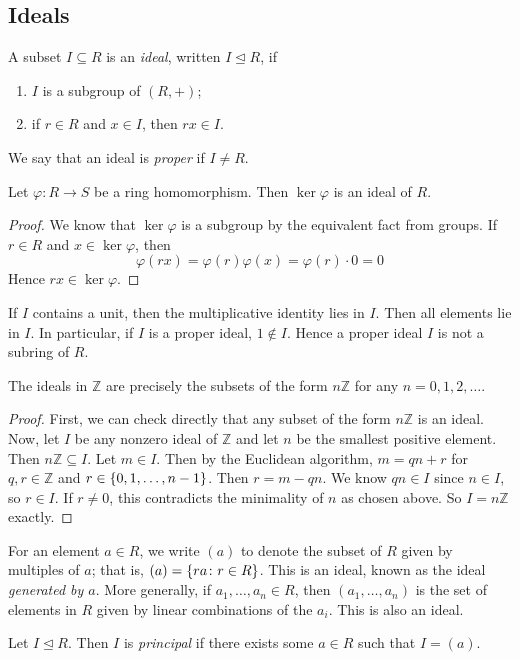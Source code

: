 \subsection{Ideals}
\begin{definition}
	A subset \( I \subseteq R \) is an \textit{ideal}, written \( I \trianglelefteq R \), if
	\begin{enumerate}
		\item \( I \) is a subgroup of \( (R, +) \);
		\item if \( r \in R \) and \( x \in I \), then \( rx \in I \).
	\end{enumerate}
	We say that an ideal is \textit{proper} if \( I \neq R \).
\end{definition}
\begin{lemma}
	Let \( \varphi \colon R \to S \) be a ring homomorphism.
	Then \( \ker \varphi \) is an ideal of \( R \).
\end{lemma}
\begin{proof}
	We know that \( \ker \varphi \) is a subgroup by the equivalent fact from groups.
	If \( r \in R \) and \( x \in \ker \varphi \), then
	\[ \varphi(rx) = \varphi(r) \varphi(x) = \varphi(r) \cdot 0 = 0 \]
	Hence \( rx \in \ker \varphi \).
\end{proof}
\begin{remark}
	If \( I \) contains a unit, then the multiplicative identity lies in \( I \).
	Then all elements lie in \( I \).
	In particular, if \( I \) is a proper ideal, \( 1 \not\in I \).
	Hence a proper ideal \( I \) is not a subring of \( R \).
\end{remark}
\begin{lemma}
	The ideals in \( \mathbb Z \) are precisely the subsets of the form \( n\mathbb Z \) for any \( n = 0, 1, 2, \dots \).
\end{lemma}
\begin{proof}
	First, we can check directly that any subset of the form \( n\mathbb Z \) is an ideal.
	Now, let \( I \) be any nonzero ideal of \( \mathbb Z \) and let \( n \) be the smallest positive element.
	Then \( n\mathbb Z \subseteq I \).
	Let \( m \in I \).
	Then by the Euclidean algorithm, \( m = qn+r \) for \( q,r \in \mathbb Z \) and \( r \in \qty{0, 1, \dots, n-1} \).
	Then \( r = m - qn \).
	We know \( qn \in I \) since \( n \in I \), so \( r \in I \).
	If \( r \neq 0 \), this contradicts the minimality of \( n \) as chosen above.
	So \( I = n\mathbb Z \) exactly.
\end{proof}
\begin{definition}
	For an element \( a \in R \), we write \( (a) \) to denote the subset of \( R \) given by multiples of \( a \); that is, \( (a) = \qty{ra \colon r\in R} \).
	This is an ideal, known as the ideal \textit{generated by \( a \)}.
	More generally, if \( a_1, \dots, a_n \in R \), then \( (a_1, \dots, a_n) \) is the set of elements in \( R \) given by linear combinations of the \( a_i \).
	This is also an ideal.
\end{definition}
\begin{definition}
	Let \( I \trianglelefteq R \).
	Then \( I \) is \textit{principal} if there exists some \( a \in R \) such that \( I = (a) \).
\end{definition}

